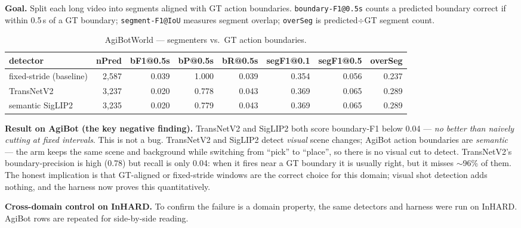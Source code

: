 \documentclass[10pt,letterpaper]{article}
\begin{document}
\textbf{Goal.} Split each long video into segments aligned with GT action boundaries.
\texttt{boundary-F1@0.5s} counts a predicted boundary correct if within 0.5\,s of a GT boundary;
\texttt{segment-F1@IoU} measures segment overlap; \texttt{overSeg} is predicted$\div$GT segment
count.

\begin{table}[H]
\centering
\caption{AgiBotWorld --- segmenters vs.\ GT action boundaries.}
\begin{tabular}{lrrrrrrr}
\toprule
detector & nPred & bF1@0.5s & bP@0.5s & bR@0.5s & segF1@0.1 & segF1@0.5 & overSeg \\
\midrule
fixed-stride (baseline) & 2{,}587 & 0.039 & 1.000 & 0.039 & 0.354 & 0.056 & 0.237 \\
TransNetV2              & 3{,}237 & 0.020 & 0.778 & 0.043 & 0.369 & 0.065 & 0.289 \\
semantic SigLIP2       & 3{,}235 & 0.020 & 0.779 & 0.043 & 0.369 & 0.065 & 0.289 \\
\bottomrule
\end{tabular}
\end{table}

\textbf{Result on AgiBot (the key negative finding).} TransNetV2 and SigLIP2 both score
boundary-F1 below 0.04 --- \emph{no better than naively cutting at fixed intervals}. This is not
a bug. TransNetV2 and SigLIP2 detect \emph{visual} scene changes; AgiBot action boundaries are
\emph{semantic} --- the arm keeps the same scene and background while switching from ``pick'' to
``place'', so there is no visual cut to detect. TransNetV2's boundary-precision is high (0.78)
but recall is only 0.04: when it fires near a GT boundary it is usually right, but it misses
$\sim$96\% of them. The honest implication is that GT-aligned or fixed-stride windows are the
correct choice for this domain; visual shot detection adds nothing, and the harness now proves
this quantitatively.

\textbf{Cross-domain control on InHARD.} To confirm the failure is a domain property, the same
detectors and harness were run on InHARD. AgiBot rows are repeated for side-by-side reading.
\end{document}
